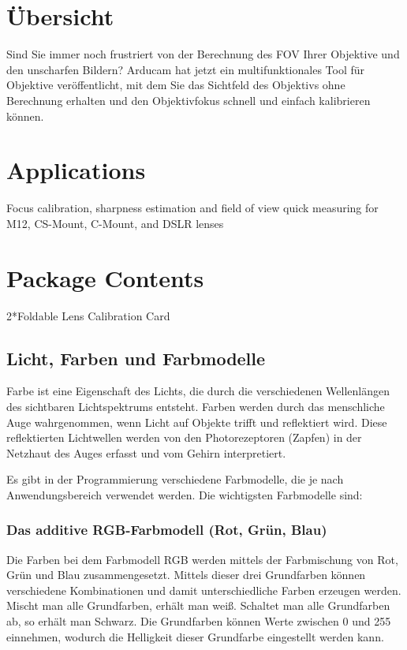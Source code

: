 \section{Übersicht}

Sind Sie immer noch frustriert von der Berechnung des FOV Ihrer Objektive und den unscharfen Bildern? Arducam hat jetzt ein multifunktionales Tool für Objektive veröffentlicht, mit dem Sie das Sichtfeld des Objektivs ohne Berechnung erhalten und den Objektivfokus schnell und einfach kalibrieren können.

\section{Applications}

Focus calibration, sharpness estimation and field of view quick measuring for M12, CS-Mount, C-Mount, and DSLR lenses

\section{Package Contents}

2*Foldable Lens Calibration Card


\subsection{Licht, Farben und Farbmodelle}
{Farbe ist eine Eigenschaft des Lichts, die durch die verschiedenen Wellenlängen des sichtbaren Lichtspektrums entsteht. Farben werden durch das menschliche Auge wahrgenommen, wenn Licht auf Objekte trifft und reflektiert wird. Diese reflektierten Lichtwellen werden von den Photorezeptoren (Zapfen) in der Netzhaut des Auges erfasst und vom Gehirn interpretiert. \cite{Hasche:2016}
    
 Es gibt in der Programmierung verschiedene Farbmodelle, die je nach Anwendungsbereich verwendet werden. Die wichtigsten Farbmodelle sind:}

\subsubsection{Das additive RGB-Farbmodell (Rot, Grün, Blau)}

Die Farben bei dem Farbmodell RGB werden mittels der Farbmischung von Rot, Grün und Blau zusammengesetzt. Mittels dieser drei Grundfarben können verschiedene Kombinationen und damit unterschiedliche Farben erzeugen werden. Mischt man alle Grundfarben, erhält man weiß. Schaltet man alle Grundfarben ab, so erhält man Schwarz.
    Die Grundfarben können Werte zwischen 0 und 255 einnehmen, wodurch die Helligkeit dieser Grundfarbe eingestellt werden kann. \cite{Hasche:2016}

